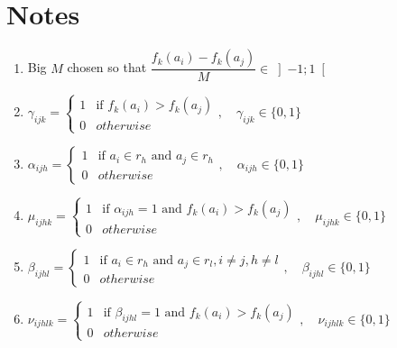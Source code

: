 \documentclass[a4paper]{article}
\begin{document}
    \section{Notes}
    \begin{enumerate}
        \item \label{note:bigm} Big $M$ chosen so that $\dfrac{f_k(a_i)-f_k(a_j)}{M} \in \left]-1;1\right[$
        \item \label{note:betaijk} $\gamma_{ijk} = \begin{cases}
            1 & \text{if } f_k(a_i) > f_k(a_j) \\
            0 & otherwise
        \end{cases}, \quad \gamma_{ijk} \in \{0, 1\}$
        \item $\alpha_{ijh} = \begin{cases}
            1 & \text{if } a_i \in r_h \text{ and } a_j \in r_h \\
            0 & otherwise
        \end{cases}, \quad \alpha_{ijh} \in \{0, 1\}$
        \item $\mu_{ijhk} = \begin{cases}
            1 & \text{if } \alpha_{ijh} = 1 \text{ and } f_k(a_i) > f_k(a_j)\\
            0 & otherwise
        \end{cases}, \quad \mu_{ijhk} \in \{0, 1\}$
        \item $\beta_{ijhl} = \begin{cases}
            1 & \text{if } a_i \in r_h \text{ and } a_j \in r_l, i \neq j, h \neq l\\
            0 & otherwise
        \end{cases}, \quad \beta_{ijhl} \in \{0, 1\}$
        \item $\nu_{ijhlk} = \begin{cases}
            1 & \text{if } \beta_{ijhl} = 1 \text{ and } f_k(a_i) > f_k(a_j)\\
            0 & otherwise
        \end{cases}, \quad \nu_{ijhlk} \in \{0, 1\}$
    \end{enumerate}
\end{document}
